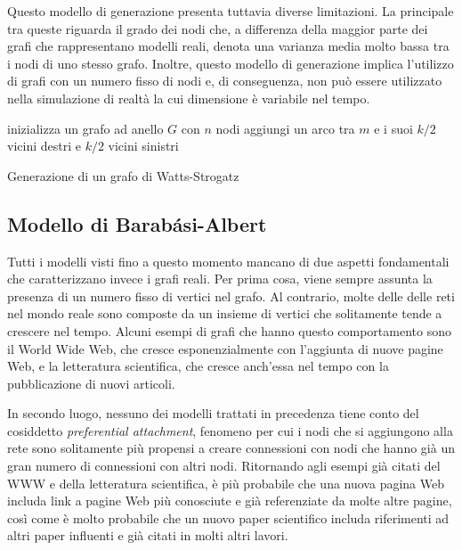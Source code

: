Questo modello di generazione presenta tuttavia diverse limitazioni. La principale tra queste riguarda il grado dei nodi che, a differenza della maggior parte dei grafi che rappresentano modelli reali, denota una varianza media molto bassa tra i nodi di uno stesso grafo. Inoltre, questo modello di generazione implica l'utilizzo di grafi con un numero fisso di nodi e, di conseguenza, non può essere utilizzato nella simulazione di realtà la cui dimensione è variabile nel tempo.

\begin{algorithm}
\SetAlgoLined
{}
 inizializza un grafo ad anello $G$ con $n$ nodi\;
  {
 	aggiungi un arco tra $m$ e i suoi $k/2$ vicini destri e $k/2$ vicini sinistri\;
 }
 \caption{Generazione di un grafo di Watts-Strogatz}
 \label{alg:wsg}
\end{algorithm}

\subsection{Modello di Barabási-Albert}
\label{subsec:barab}
Tutti i modelli visti fino a questo momento mancano di due aspetti fondamentali che caratterizzano invece i grafi reali. Per prima cosa, viene sempre assunta la presenza di un numero fisso di vertici nel grafo. Al contrario, molte delle delle reti nel mondo reale sono composte da un insieme di vertici che solitamente tende a crescere nel tempo. Alcuni esempi di grafi che hanno questo comportamento sono il World Wide Web, che cresce esponenzialmente con l'aggiunta di nuove pagine Web, e la letteratura scientifica, che cresce anch'essa nel tempo con la pubblicazione di nuovi articoli. 

In secondo luogo, nessuno dei modelli trattati in precedenza tiene conto del cosiddetto \textit{preferential attachment}, fenomeno per cui i nodi che si aggiungono alla rete sono solitamente più propensi a creare connessioni con nodi che hanno già un gran numero di connessioni con altri nodi. Ritornando agli esempi già citati del WWW e della letteratura scientifica, è più probabile che una nuova pagina Web includa link a pagine Web più conosciute e già referenziate da molte altre pagine, così come è molto probabile che un nuovo paper scientifico includa riferimenti ad altri paper influenti e già citati in molti altri lavori. 

